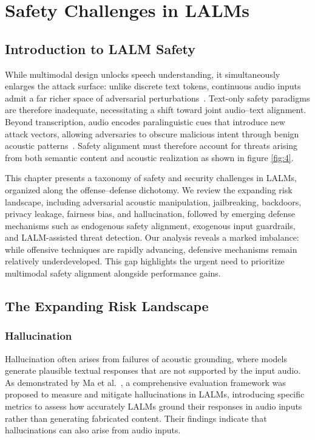 \section{Safety Challenges in LALMs}
\subsection{Introduction to LALM Safety}

While multimodal design unlocks speech understanding, it simultaneously enlarges the attack surface: unlike discrete text tokens, continuous audio inputs admit a far richer space of adversarial perturbations~\cite{cheng2025jailbreak}.
Text-only safety paradigms are therefore inadequate, necessitating a shift toward joint audio--text alignment. Beyond transcription, audio encodes paralinguistic cues that introduce new attack vectors, allowing adversaries to obscure malicious intent through benign acoustic patterns~\cite{sadasivan2025attacker}. Safety alignment must therefore account for threats arising from both semantic content and acoustic realization as shown in figure \ref{fig:4}.

This chapter presents a taxonomy of safety and security challenges in LALMs, organized along the offense--defense dichotomy. We review the expanding risk landscape, including adversarial acoustic manipulation, jailbreaking, backdoors, privacy leakage, fairness bias, and hallucination, followed by emerging defense mechanisms such as endogenous safety alignment, exogenous input guardrails, and LALM-assisted threat detection. Our analysis reveals a marked imbalance: while offensive techniques are rapidly advancing, defensive mechanisms remain relatively underdeveloped. This gap highlights the urgent need to prioritize multimodal safety alignment alongside performance gains.


\subsection{The Expanding Risk Landscape}

\subsubsection{Hallucination}
Hallucination often arises from failures of acoustic grounding, where models generate plausible textual responses that are not supported by the input audio.
As demonstrated by Ma et al.~\cite{ma2025towards}, a comprehensive evaluation framework was proposed to measure and mitigate hallucinations in LALMs, introducing specific metrics to assess how accurately LALMs ground their responses in audio inputs rather than generating fabricated content. Their findings indicate that hallucinations can also arise from audio inputs.


